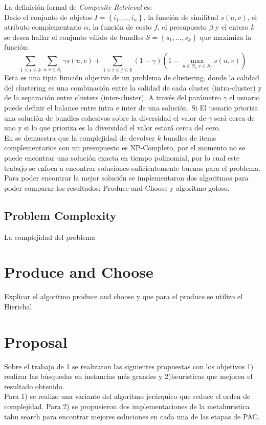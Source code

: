 La definición formal de \textit{Composite Retrieval} es:\\
Dado el conjunto de objetos $I = \left\{i_1, \ldots, i_n \right\}$, la función de similitud $s(u,v)$, el atributo complementario $\alpha$, la función de costo $f$, el presupuesto $\beta$ y el entero $k$ se desea hallar el conjunto válido de bundles $S = \left\{s_1, \ldots, s_k\right\}$ que maximiza la función:
\begin{equation} \label{des:eq-fnObj}
  \sum_{1 \leq i \leq k}{\sum_{u,v \in S_i}{\gamma s(u,v)}} + \sum_{1 \leq i \leq j \leq k}{(1-\gamma) (1-\max_{u \in S_i, v \in S_j}{s(u,v)})}
\end{equation}
Esta es una tipia función objetivo de un problema de clustering, donde la calidad del clustering es una combinación entre la calidad de cada cluster (intra-cluster) y de la separación entre clusters (inter-cluster). A través del parámetro $\gamma$ el usuario puede definir el balance entre intra e inter de una solución. Si El usuario prioriza una solución de bundles cohesivos sobre la diversidad el  valor de $\gamma$ será cerca de uno y si lo que prioriza es la diversidad el valor estará cerca del cero.\\
En \cite{compositeRetrival} se demuestra que la complejidad de devolver $k$ bundles de items complementarios con un presupuesto es NP-Completo, por el momento no se puede encontrar una solución exacta en tiempo polinomial, por lo cual este trabajo se enfoca a encontrar soluciones suficientemente buenas para el problema. Para poder encontrar la mejor solución se implementaron dos algoritmos para poder comparar los resultados: Produce-and-Choose y algoritmo goloso.
\subsection{Problem Complexity}
La complejidad del problema
\section{Produce and Choose}
Explicar el algoritmo produce and choose y que para el produce se utilizo el Hierichal
\section{Proposal}
Sobre el trabajo de 1 se realizaron las siguientes propuestas con los objetivos 1) realizar las búsquedas en instancias más grandes y 2)heuristicas que mejoren el resultado obtenido.\\
Para 1) se realizo una variante del algoritmo jerárquico que reduce el orden de complejidad. 
Para 2) se propusieron dos implementaciones de la metahuristica tabu search para encontrar mejores soluciones en cada una de las etapas de PAC.

